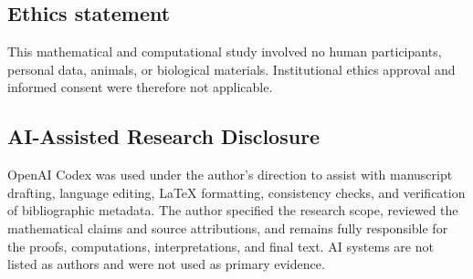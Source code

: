 \documentclass[11pt,a4paper]{article}
\theoremstyle{definition}
\begin{document}
\subsection*{Ethics statement}
This mathematical and computational study involved no human participants,
personal data, animals, or biological materials.  Institutional ethics
approval and informed consent were therefore not applicable.

\subsection*{AI-Assisted Research Disclosure}
OpenAI Codex was used under the author's direction to assist with manuscript
drafting, language editing, \LaTeX{} formatting, consistency checks, and
verification of bibliographic metadata.  The author specified the research
scope, reviewed the mathematical claims and source attributions, and remains
fully responsible for the proofs, computations, interpretations, and final
text.  AI systems are not listed as authors and were not used as primary
evidence.



\end{document}
